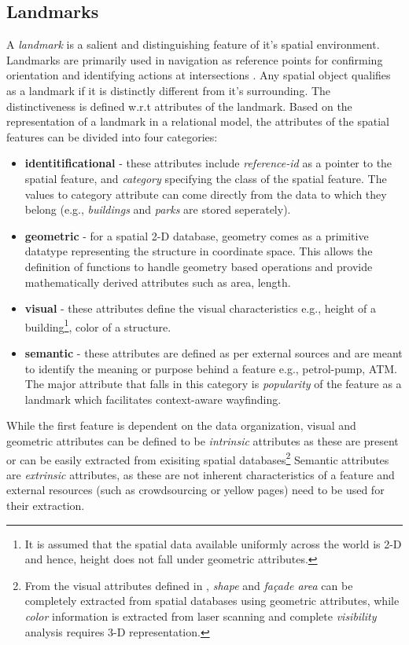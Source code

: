 \documentclass{iitkthesis}
\begin{document}
\subsection{Landmarks}
A \textit{landmark} is a salient and distinguishing feature of it's spatial environment. Landmarks are primarily used in navigation as reference points for confirming orientation and identifying actions at intersections \cite{lovelace}. Any spatial object qualifies as a landmark if it is distinctly different from it's surrounding.  The distinctiveness is defined w.r.t attributes of the landmark. Based on the representation of a landmark in a relational model, the attributes of the spatial features can be divided into four categories:
\begin{itemize}
  \item \textbf{identitificational} - these attributes include \textit{reference-id} as a pointer to the spatial feature, and \textit{category} specifying the class of the spatial feature. The values to category attribute can come directly from the data to which they belong (e.g., \textit{buildings} and \textit{parks} are stored seperately).
  \item \textbf{geometric} - for a spatial 2-D database, geometry comes as a primitive datatype representing the structure in coordinate space. This allows the definition of functions to handle geometry based operations and provide mathematically derived attributes such as area, length.
  \item \textbf{visual} -  these attributes define the visual characteristics e.g., height of a building\footnote{It is assumed that the spatial data available uniformly across the world is 2-D and hence, height does not fall under geometric attributes.}, color of a structure.
  \item \textbf{semantic} - these attributes are defined as per external sources and are meant to identify the meaning or purpose behind a feature e.g., petrol-pump, ATM.  The major attribute that falls in this category is \textit{popularity} of the feature as a landmark which facilitates context-aware wayfinding.
\end{itemize}

While the first feature is dependent on the data organization, visual and geometric attributes can be defined to be \textit{intrinsic} attributes as these are present or can be easily extracted from exisiting spatial databases\footnote{From the visual attributes defined in \cite{raubal}, \textit{shape} and \textit{fa\c{c}ade area} can be completely extracted from spatial databases using geometric attributes, while \textit{color} information is extracted from laser scanning and complete \textit{visibility} analysis requires 3-D representation.} Semantic attributes are \textit{extrinsic} attributes, as these are not inherent characteristics of a feature and external resources (such as crowdsourcing or yellow pages) need to be used for their extraction.
\end{document}
